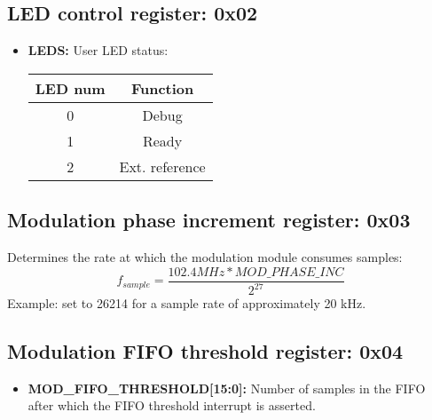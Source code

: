 \documentclass{article}
\newcommand{\bitrect}[2]{
  \begin{pgfonlayer}{foreground}
    \draw [thick] (0,0) rectangle (#1,1);
    \pgfmathsetmacro\result{#1-1}
    \foreach \x in {1,...,\result}
      \draw [thick] (\x,1) -- (\x, 0.8);
  \end{pgfonlayer}
  \bitlabels{#1}{#2}
}
\newcommand{\rwbits}[3]{
  \draw [thick] (#1,0) rectangle ++(#2,1) node[pos=0.5]{#3};
  \pgfmathsetmacro\start{#1+0.5}
  \pgfmathsetmacro\finish{#1+#2-0.5}
}
\newcommand{\robits}[3]{
  \begin{pgfonlayer}{background}
    \draw [thick, fill=lightgray] (#1,0) rectangle ++(#2,1) node[pos=0.5]{#3};
  \end{pgfonlayer}
  \pgfmathsetmacro\start{#1+0.5}
  \pgfmathsetmacro\finish{#1+#2-0.5}
}
\newcommand{\bitlabels}[2]{
  \foreach \bit in {1,...,#1}{
     \pgfmathsetmacro\result{#2}
     \node [above] at (\bit-0.5, 1) {\pgfmathprintnumber{\result}};
   }
}
\begin{document}
\subsection{LED control register: 0x02}
\begin{center}
\end{center}
\begin{itemize}
\item \textbf{LEDS:} User LED status:
\begin{center}
\begin{tabular}{ c|c }
LED num & Function\\
 \hline
0 & Debug\\
1 & Ready\\
2 & Ext. reference\\
\end{tabular}
\end{center}
\end{itemize}

\subsection{Modulation phase increment register: 0x03}
\begin{center}
\end{center}

Determines the rate at which the modulation module consumes samples:
$$
f_{sample} = \frac{102.4 MHz * MOD\_PHASE\_INC}{2^{27}}
$$
Example: set to 26214 for a sample rate of approximately 20 kHz.

\subsection{Modulation FIFO threshold register: 0x04}
\label{reg:mod:fifo:thresh}
\begin{center}
\end{center}
\begin{itemize}
\item \textbf{MOD\_FIFO\_THRESHOLD[15:0]:} Number of samples in the FIFO after which the FIFO threshold interrupt is asserted.
\end{itemize}
\end{document}
